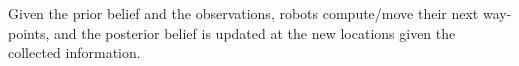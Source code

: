 \documentclass[letterpaper, 10 pt, conference]{ieeeconf}
\DeclareMathOperator*{\argmin}{arg\,min}
\begin{document}
%
Given the prior belief and the observations, robots compute/move their next way-points, and the posterior belief is updated at the new locations given the collected information.
\end{document}
